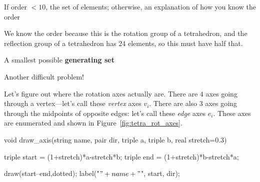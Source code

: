 \documentclass[../key.tex]{subfiles}
\begin{document}
\begin{inner_problem}
\item If order $< 10$, the set of elements; otherwise, an explanation of how you know the order
\end{inner_problem}

\noindent We know the order because this is the rotation group of a tetrahedron, and the reflection group of a tetrahedron has $24$ elements, so this must have half that.

\begin{inner_problem}
\item A smallest possible \textbf{generating set}
\end{inner_problem}

\noindent Another difficult problem!

Let's figure out where the rotation axes actually are. There are $4$ axes going through a vertex---let's call these \textit{vertex} axes $v_i$. There are also $3$ axes going through the midpoints of opposite edges: let's call these \textit{edge} axes $e_i$. These axes are enumerated and shown in Figure~\ref{fig:tetra_rot_axes}.

\begin{asydef}
void draw_axis(string name, pair dir, triple a, triple b, real stretch=0.3) {
	triple start = (1+stretch)*a-stretch*b;
	triple end = (1+stretch)*b-stretch*a;

	draw(start--end,dotted);
	label("$" + name + "$", start, dir);
}
\end{asydef}
\end{document}
